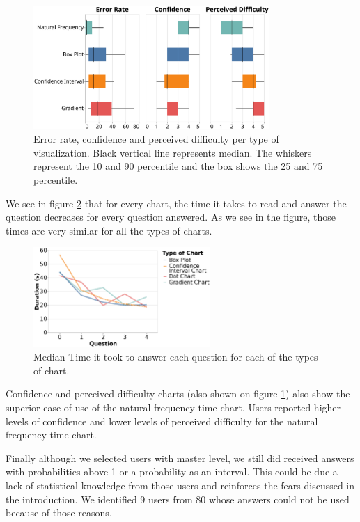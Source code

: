 \documentclass[a4paper,3p,sort&compress]{elsarticle}
\begin{document}
\begin{figure}
  \centering
  \includegraphics[width=0.8\textwidth]{comparison}
  \caption{\label{figure:errors}Error rate, confidence and perceived difficulty per 
  type of visualization. Black vertical line represents median.
  The whiskers represent the 10 and 90 percentile and the box shows the 25 and 
  75 percentile.}
\end{figure}

We see in figure \ref{figure:duration} that for every chart, the time it takes 
to read and answer the question decreases for every question answered. As we see in the figure, those times 
are very similar for all the types of charts. 

\begin{figure}
  \centering
   \includegraphics[width=0.6\textwidth]{duration_evo2}
  \caption{\label{figure:duration} Median Time it took to answer each question for each of the types of chart.}
\end{figure}  

Confidence and perceived difficulty charts (also shown on figure \ref{figure:errors}) also show the superior ease of use 
of the natural frequency time chart. Users reported higher levels of confidence and 
lower levels of perceived difficulty for the natural frequency time chart.


Finally although we selected users with master level, we still did received answers with probabilities 
above 1 or a probability as an interval. This could be due a lack of statistical knowledge from those 
users and reinforces the fears discussed in the introduction. 
We identified 9 users from 80 whose answers could not be used because of those reasons.
\end{document}
